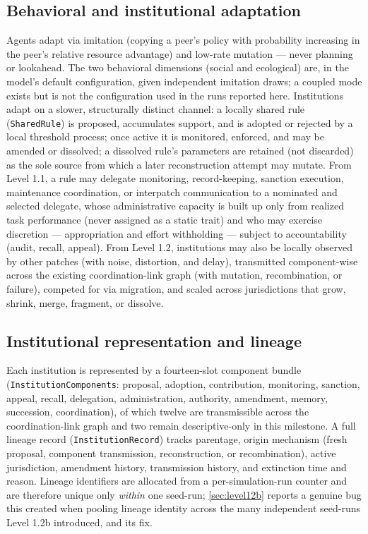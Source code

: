 \subsection{Behavioral and institutional adaptation}
\label{sec:behavioral-adaptation}

Agents adapt via imitation (copying a peer's policy with probability
increasing in the peer's relative resource advantage) and low-rate
mutation --- never planning or lookahead. The two behavioral dimensions
(social and ecological) are, in the model's default configuration, given
independent imitation draws; a coupled mode exists but is not the
configuration used in the runs reported here. Institutions adapt on a
slower, structurally distinct channel: a locally shared rule
(\texttt{SharedRule}) is proposed, accumulates support, and is adopted or
rejected by a local threshold process; once active it is monitored,
enforced, and may be amended or dissolved; a dissolved rule's parameters
are retained (not discarded) as the sole source from which a later
reconstruction attempt may mutate. From Level 1.1, a rule may delegate
monitoring, record-keeping, sanction execution, maintenance coordination,
or interpatch communication to a nominated and selected delegate, whose
administrative capacity is built up only from realized task performance
(never assigned as a static trait) and who may exercise discretion ---
appropriation and effort withholding --- subject to accountability
(audit, recall, appeal). From Level 1.2, institutions may also be locally
observed by other patches (with noise, distortion, and delay), transmitted
component-wise across the existing coordination-link graph (with
mutation, recombination, or failure), competed for via migration, and
scaled across jurisdictions that grow, shrink, merge, fragment, or
dissolve.

\subsection{Institutional representation and lineage}
\label{sec:institutional-representation}

Each institution is represented by a fourteen-slot component bundle
(\texttt{InstitutionComponents}: proposal, adoption, contribution,
monitoring, sanction, appeal, recall, delegation, administration,
authority, amendment, memory, succession, coordination), of which twelve
are transmissible across the coordination-link graph and two remain
descriptive-only in this milestone. A full lineage record
(\texttt{InstitutionRecord}) tracks parentage, origin mechanism (fresh
proposal, component transmission, reconstruction, or recombination),
active jurisdiction, amendment history, transmission history, and
extinction time and reason. Lineage identifiers are allocated from a
per-simulation-run counter and are therefore unique only \textit{within}
one seed-run; \cref{sec:level12b} reports a genuine bug this created when
pooling lineage identity across the many independent seed-runs Level 1.2b
introduced, and its fix.

